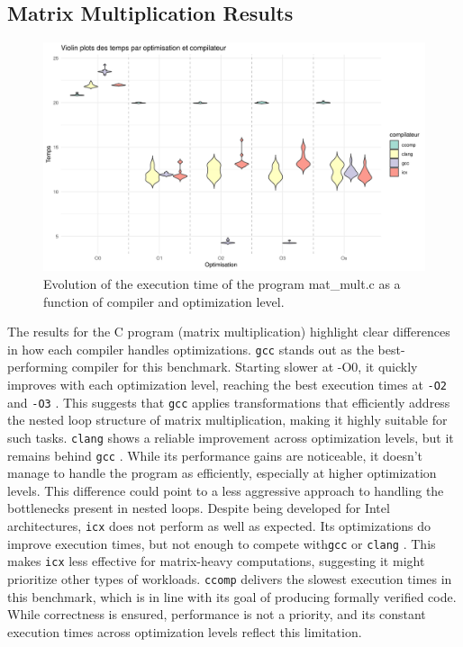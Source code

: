 \documentclass{rapport}
\newcommand{\gcc}{\texttt{gcc} }
\newcommand{\icx}{\texttt{icx} }
\newcommand{\clang}{\texttt{clang} }
\newcommand{\comp}{\texttt{ccomp} }
\newcommand{\optitwo}{\texttt{-O2} }
\newcommand{\optithree}{\texttt{-O3} }
\begin{document}
\subsection{Matrix Multiplication Results}
\begin{figure}[H]
\centering
\includegraphics[width=1\textwidth]{img/plots/violin_plot_mat_mult.png}
\caption{Evolution of the execution time of the program mat\_mult.c as a function of compiler and optimization level.}
\label{fig:image1}
\end{figure}
The results for the C program (matrix multiplication) highlight clear differences in how each compiler handles optimizations.\newline
\gcc stands out as the best-performing compiler for this benchmark. Starting slower at -O0, it quickly improves with each optimization level, reaching the best execution times at 
\optitwo and \optithree. This suggests that \gcc applies transformations that efficiently address the nested loop structure of matrix multiplication, making it highly suitable for 
such tasks.
\newline
\clang shows a reliable improvement across optimization levels, but it remains behind \gcc. While its performance gains are noticeable, it doesn’t manage to handle the program as 
efficiently, especially at higher optimization levels. This difference could point to a less aggressive approach to handling the bottlenecks present in nested loops. \newline
Despite being developed for Intel architectures, \icx does not perform as well as expected. Its optimizations do improve execution times, but not enough to compete with\gcc or \clang. 
This makes \icx less effective for matrix-heavy computations, suggesting it might prioritize other types of workloads. \newline
\comp delivers the slowest execution times in this benchmark, which is in line with its goal of producing formally verified code. While correctness is ensured, 
performance is not a priority, and its constant execution times across optimization levels reflect this limitation.
\end{document}
